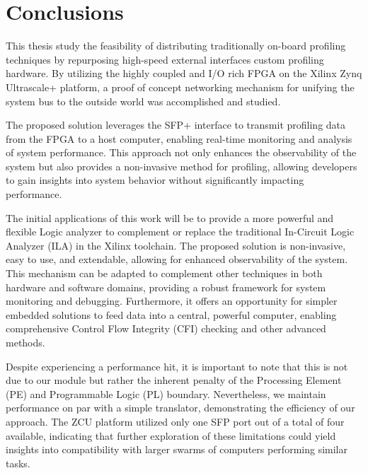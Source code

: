 \chapter{Conclusions}
\label{chapter:Conclusions}
\thispagestyle{myheadings}

\graphicspath{{4_Conclusion/Figures/}}
This thesis study the feasibility of distributing traditionally on-board profiling techniques by repurposing high-speed external interfaces custom profiling hardware. By utilizing the highly coupled and I/O rich FPGA on the  Xilinx Zynq Ultrascale+ platform, a proof of concept networking mechanism for unifying the system bus to the outside world was accomplished and studied. 

The proposed solution leverages the SFP+ interface to transmit profiling data from the FPGA to a host computer, enabling real-time monitoring and analysis of system performance. This approach not only enhances the observability of the system but also provides a non-invasive method for profiling, allowing developers to gain insights into system behavior without significantly impacting performance.

The initial applications of this work will be to provide a more powerful and flexible Logic analyzer to complement or replace the traditional In-Circuit Logic Analyzer (ILA) in the Xilinx toolchain. The proposed solution is non-invasive, easy to use, and extendable, allowing for enhanced observability of the system. This mechanism can be adapted to complement other techniques in both hardware and software domains, providing a robust framework for system monitoring and debugging. Furthermore, it offers an opportunity for simpler embedded solutions to feed data into a central, powerful computer, enabling comprehensive Control Flow Integrity (CFI) checking and other advanced methods.

Despite experiencing a performance hit, it is important to note that this is not due to our module but rather the inherent penalty of the Processing Element (PE) and Programmable Logic (PL) boundary. Nevertheless, we maintain performance on par with a simple translator, demonstrating the efficiency of our approach. The ZCU platform utilized only one SFP port out of a total of four available, indicating that further exploration of these limitations could yield insights into compatibility with larger swarms of computers performing similar tasks.

